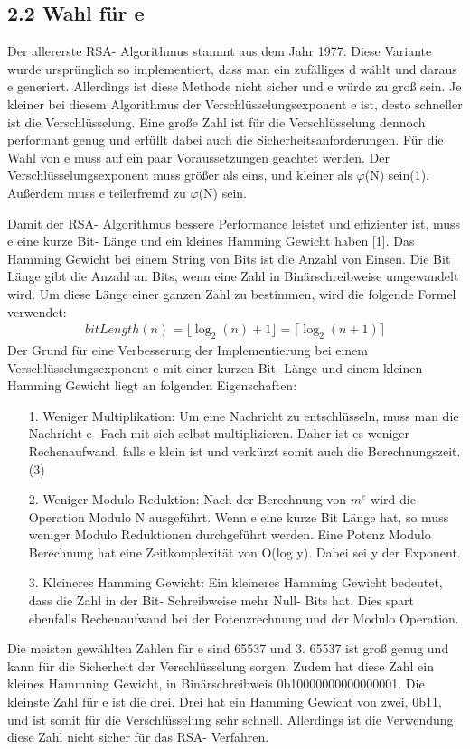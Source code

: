\documentclass[course=asp]{aspdoc}
\begin{document}
\subsection*{2.2 Wahl für e }
Der allererste RSA- Algorithmus stammt aus dem Jahr 1977. Diese Variante wurde ursprünglich so implementiert, dass man ein zufälliges d wählt und daraus e generiert. Allerdings ist diese Methode nicht sicher und e würde zu groß sein. Je kleiner bei diesem Algorithmus der Verschlüsselungsexponent e ist, desto schneller ist die Verschlüsselung. Eine große Zahl ist für die Verschlüsselung dennoch performant genug und erfüllt dabei auch die Sicherheitsanforderungen. Für die Wahl von e muss auf ein paar Voraussetzungen geachtet werden. Der Verschlüsselungsexponent muss größer als eins, und kleiner als $\varphi $(N) sein(1). Außerdem muss e teilerfremd zu $\varphi $(N) sein.

Damit der RSA- Algorithmus bessere Performance leistet und effizienter ist, muss e eine kurze Bit- Länge und ein kleines Hamming Gewicht haben [1]. Das Hamming Gewicht bei einem String von Bits ist die Anzahl von Einsen. Die Bit Länge gibt die Anzahl an Bits, wenn eine Zahl in Binärschreibweise umgewandelt wird. Um diese Länge einer ganzen Zahl zu bestimmen, wird die folgende Formel verwendet:
\begin{align}
	bitLength(n) = \lfloor \log_{2}(n) + 1 \rfloor = \lceil \log_{2}(n + 1)\rceil
\end{align}
Der Grund für eine Verbesserung der Implementierung bei einem Verschlüsselungsexponent e mit einer kurzen Bit- Länge und einem kleinen Hamming Gewicht liegt an folgenden Eigenschaften:
\begin{itemize}
 \item [1.] Weniger Multiplikation: Um eine Nachricht zu entschlüsseln, muss man die Nachricht e- Fach mit sich selbst multiplizieren. Daher ist es weniger Rechenaufwand, falls e klein ist und verkürzt somit auch die Berechnungszeit.(3)
 \item [2.] Weniger Modulo Reduktion: Nach der Berechnung von $m^{e}$ wird die Operation Modulo N ausgeführt. Wenn e eine kurze Bit Länge hat, so muss weniger Modulo Reduktionen durchgeführt werden. Eine Potenz Modulo Berechnung hat eine Zeitkomplexität von O(log y). Dabei sei y der Exponent.   
 \item [3.] Kleineres Hamming Gewicht: Ein kleineres Hamming Gewicht bedeutet, dass die Zahl in der Bit- Schreibweise mehr Null- Bits hat. Dies spart ebenfalls Rechenaufwand bei der Potenzrechnung und der Modulo Operation.
\end{itemize}
Die meisten gewählten Zahlen für e sind 65537 und 3. 65537 ist groß genug und kann für die Sicherheit der Verschlüsselung sorgen. Zudem hat diese Zahl ein kleines Hammning Gewicht, in Binärschreibweis 0b10000000000000001. Die kleinste Zahl für e ist die drei. Drei hat ein Hamming Gewicht von zwei, 0b11, und ist somit für die Verschlüsselung sehr schnell. Allerdings ist die Verwendung diese Zahl nicht sicher für das RSA- Verfahren. %
\end{document}
